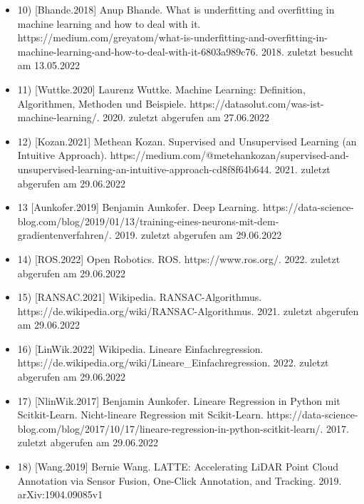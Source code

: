 \documentclass[169, handout	]{THIbeamer} %
\begin{document}
\iftrue
	\begin{frame}
		\begin{itemize}
			\item 10) [Bhande.2018] Anup Bhande. What is underfitting and overfitting in machine learning and how to deal with it. https://medium.com/greyatom/what-is-underfitting-and-overfitting-in-machine-learning-and-how-to-deal-with-it-6803a989c76. 2018. zuletzt besucht am 13.05.2022
			\item 11) [Wuttke.2020] Laurenz Wuttke. Machine Learning: Definition, Algorithmen, Methoden und Beispiele. https://datasolut.com/was-ist-machine-learning/. 2020. zuletzt abgerufen am 27.06.2022
			\item 12) [Kozan.2021] Methean Kozan. Supervised and Unsupervised Learning (an Intuitive Approach). https://medium.com/@metehankozan/supervised-and-unsupervised-learning-an-intuitive-approach-cd8f8f64b644. 2021. zuletzt abgerufen am 29.06.2022 
			\item 13 [Aunkofer.2019] Benjamin Aunkofer. Deep Learning. https://data-science-blog.com/blog/2019/01/13/training-eines-neurons-mit-dem-gradientenverfahren/. 2019. zuletzt abgerufen am 29.06.2022 
		\end{itemize}
	\end{frame}
	\begin{frame}
		\begin{itemize}
			\item 14) [ROS.2022] Open Robotics. ROS. https://www.ros.org/. 2022. zuletzt abgerufen am 29.06.2022
			\item 15) [RANSAC.2021] Wikipedia. RANSAC-Algorithmus. https://de.wikipedia.org/wiki/RANSAC-Algorithmus. 2021. zuletzt abgerufen am 29.06.2022
			\item 16) [LinWik.2022] Wikipedia. Lineare Einfachregression. https://de.wikipedia.org/wiki/Lineare\_Einfachregression. 2022. zuletzt abgerufen am 29.06.2022
			\item 17) [NlinWik.2017] Benjamin Aunkofer. Lineare Regression in Python mit Scitkit-Learn. Nicht-lineare Regression mit Scikit-Learn. https://data-science-blog.com/blog/2017/10/17/lineare-regression-in-python-scitkit-learn/. 2017. zuletzt abgerufen am 29.06.2022
		\end{itemize}
	\end{frame}
	\begin{frame}
		\begin{itemize}
			\item 18) [Wang.2019] Bernie Wang. LATTE: Accelerating LiDAR Point Cloud Annotation via Sensor Fusion, One-Click Annotation, and Tracking. 2019. arXiv:1904.09085v1
		\end{itemize}
	\end{frame}
\end{document}
